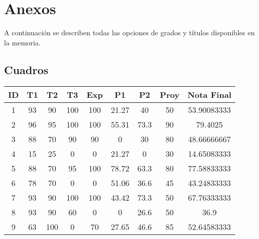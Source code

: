 \chapter{Anexos}
\label{ch:Anexos}

A continuación se describen todas las opciones de grados y títulos disponibles en la memoria.


\section{Cuadros}
\newpage


\begin{table}[H]
    \centering
    \begin{tabular}{|c|c|c|c|c|c|c|c|c|}
\hline
\textbf{ID} & \textbf{T1} & \textbf{T2} & \textbf{T3} & \textbf{Exp} & \textbf{P1} & \textbf{P2} & \textbf{Proy} & \textbf{Nota Final} \\ \hline
1           & 93          & 90          & 100         & 100          & 21.27       & 40          & 50            & 53.90083333         \\ \hline
2           & 96          & 95          & 100         & 100          & 55.31       & 73.3        & 90            & 79.4025             \\ \hline
3           & 88          & 70          & 90          & 90           & 0           & 30          & 80            & 48.66666667         \\ \hline
4           & 15          & 25          & 0           & 0            & 21.27       & 0           & 30            & 14.65083333         \\ \hline
5           & 88          & 70          & 95          & 100          & 78.72       & 63.3        & 80            & 77.58833333         \\ \hline
6           & 78          & 70          & 0           & 0            & 51.06       & 36.6        & 45            & 43.24833333         \\ \hline
7           & 93          & 90          & 100         & 100          & 43.42       & 73.3        & 50            & 67.76333333         \\ \hline
8           & 93          & 90          & 60          & 0            & 0           & 26.6        & 50            & 36.9                \\ \hline
9           & 63          & 100         & 0           & 70           & 27.65       & 46.6        & 85            & 52.64583333         \\ \hline

\end{tabular}
\end{table}
